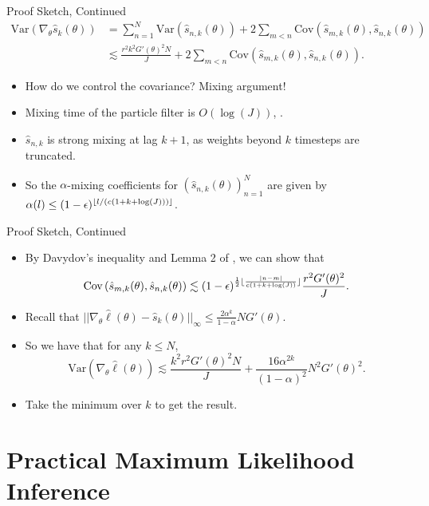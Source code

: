 \documentclass{beamer}
\begin{document}
\begin{frame}{Proof Sketch, Continued}
\begin{align*}
    \text{Var}(\nabla_\theta \hat s_k(\theta)) 
    &= \sum_{n=1}^N\text{Var}\left(\hat s_{n,k}(\theta)\right)+ 2\sum_{m<n}\text{Cov}\left(\hat s_{m,k}(\theta), \hat s_{n,k}(\theta)\right) \\
    &\lesssim \frac{r^2k^2G'(\theta)^2N}{J} + 2\sum_{m<n}\text{Cov}\left(\hat s_{m,k}(\theta), \hat s_{n,k}(\theta)\right).
\end{align*}
\pause
    \begin{itemize}
        \item How do we control the covariance? Mixing argument!\pause
        \item Mixing time of the particle filter is $O(\log(J))$, \cite{karjalainen2023}. \pause
        \item $\hat s_{n,k}$ is strong mixing at lag $k+1$, as weights beyond $k$ timesteps are truncated. \pause
        \item So the $\alpha$-mixing coefficients for $(\hat s_{n,k}(\theta))_{n=1}^N$ are given by $\alpha(l) \leq (1-\epsilon)^{\lfloor l/(c(1+k+\log(J))) \rfloor}$. 
    \end{itemize}
\end{frame}

\begin{frame}{Proof Sketch, Continued}
    \begin{itemize}
        \item By Davydov's inequality and Lemma 2 of \cite{karjalainen2023}, we can show that \pause
    $$\text{Cov}\left(\hat s_{m,k}(\theta), \hat s_{n,k}(\theta)\right) \lesssim (1-\epsilon)^{\frac{1}{2}\lfloor \frac{|n-m|}{c(1+k+\log(J))} \rfloor}\frac{r^2G'(\theta)^2}{J}.$$
    \pause
    \item Recall that $||\nabla_\theta\hat\ell(\theta) - \hat s_k(\theta)||_\infty \leq \frac{2\alpha^k}{1-\alpha}NG'(\theta)$.\pause
    \item So we have that for any $k\leq N$,
    $$\text{Var}(\nabla_\theta \hat\ell(\theta)) \lesssim \frac{k^2r^2G'(\theta)^2N}{J} + \frac{16\alpha^{2k}}{(1-\alpha)^2}N^2G'(\theta)^2.$$
    \pause
    \item Take the minimum over $k$ to get the result. 
    \end{itemize}
\end{frame}

\section{Practical Maximum Likelihood Inference}
\end{document}
